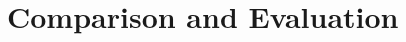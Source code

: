 \documentclass[preview]{standalone}
\begin{document}
\section{Comparison and Evaluation}
\end{document}
